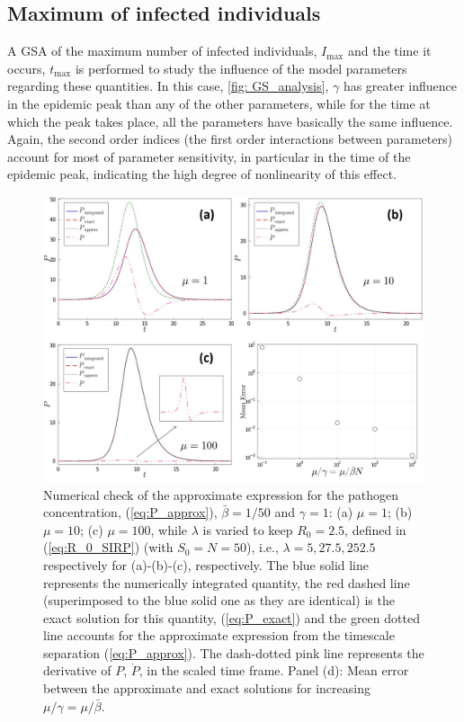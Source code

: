 \subsection{Maximum of infected individuals}

A GSA of the maximum number of infected individuals, $I_{\textrm{max}}$ and
the time it occurs, $t_{\textrm{max}}$ is performed to study the influence of
the model parameters regarding these quantities. In this case, \cref{fig:
    GS_analysis}, $\gamma$ has greater influence in the epidemic peak than any
of
the other parameters, while for the time at which the peak takes place, all the
parameters have basically the same influence. Again, the second order indices
(the first order interactions between parameters) account for most of parameter
sensitivity, in particular in the time of the epidemic peak, indicating the
high degree of nonlinearity of this effect.

\begin{figure}[H]
    \centering
    \includegraphics[width=1\textwidth]{Figures/P_comparison.jpg}
    \caption{Numerical check of the approximate expression for the pathogen
        concentration, (\cref{eq:P_approx}), $\bar{\beta}=1/50$ and $\gamma=1$:
        (a)
        $\mu=1$; (b) $\mu=10$; (c) $\mu=100$, while $\lambda$ is varied to keep
        $R_0=2.5$, defined in (\cref{eq:R_0_SIRP}) (with $S_0=N=50$), i.e.,
        $\lambda=5,
            27.5, 252.5$ respectively for (a)-(b)-(c), respectively.
        The blue solid line represents the numerically integrated quantity, the
        red dashed line (superimposed to the blue solid one as they are
        identical) is
        the exact solution for this quantity, (\cref{eq:P_exact}) and the green
        dotted
        line accounts for the approximate expression from the timescale
        separation
        (\cref{eq:P_approx}). The dash-dotted pink line represents the
        derivative of
        $P$, $\dot{P}$, in the scaled time frame. Panel (d): Mean error between
        the
        approximate and exact solutions for increasing
        $\mu/\gamma=\mu/\bar{\beta}$.}
    \label{fig:P_comparison}
\end{figure}

